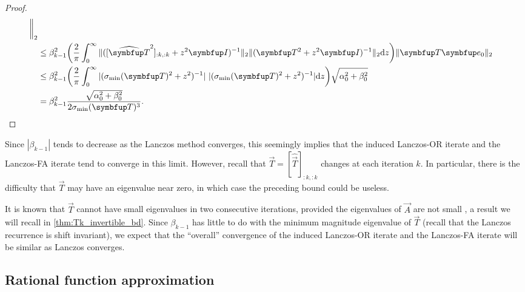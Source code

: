 \begin{proof}
\begin{align*}
     \bigg\|_2
    \\&
    \leq \beta_{k-1}^2 
     \bigg( \frac{2 }{\pi} \int_{0}^{\infty}
    \| ([\widehat{\vec{T}}^2]_{:k,:k} + z^2 \vec{I})^{-1} \|_2 \| (\vec{T}^2 + z^2 \vec{I})^{-1} \|_2 \d{z} \bigg)  \| \vec{T}\vec{e}_0 \|_2
    \\& \leq
    \beta_{k-1}^2 
     \bigg( \frac{2 }{\pi} \int_{0}^{\infty}
    | (\sigma_{\textup{min}}\mf{\vec{T}}^2 + z^2 )^{-1} |~ | (\sigma_{\textup{min}}\mf{\vec{T}}^2 + z^2 )^{-1} | \d{z} \bigg)  \sqrt{\alpha_0^2+\beta_0^2}
    \\&= \beta_{k-1}^2 
    \frac{\sqrt{\alpha_0^2+\beta_0^2}}{2 \sigma_{\textup{min}}\mf{\vec{T}}^3}.
    \tag*{\qedhere}
\end{align*}
\end{proof}

Since $|\beta_{k-1}|$ tends to decrease as the Lanczos method converges, this seemingly implies that the induced Lanczos-OR iterate and the Lanczos-FA iterate tend to converge in this limit.
However, recall that $\vec{T} = [\widehat{\vec{T}}]_{:k,:k}$ changes at each iteration $k$.
In particular, there is the difficulty that $\vec{T}$ may have an eigenvalue near zero, in which case the preceding bound could be useless.

It is known that \( \vec{T} \) cannot have small eigenvalues in two consecutive iterations, provided the eigenvalues of \( \vec{A} \) are not small \cite{greenbaum_druskin_knizhnerman_99}, a result we will recall in \cref{thm:Tk_invertible_bd}.
Since $\beta_{k-1}$ has little to do with the minimum magnitude eigenvalue of $\vec{T}$ (recall that the Lanczos recurrence is shift invariant), we expect that the ``overall'' convergence of the induced Lanczos-OR iterate and the Lanczos-FA iterate will be similar as Lanczos converges.


\subsection{Rational function approximation}
\label{sec:rational_func}


